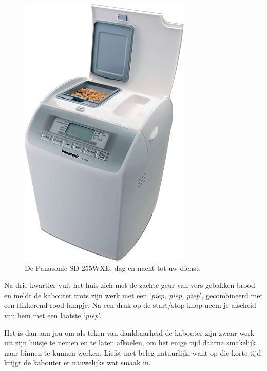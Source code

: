 \documentclass[
  11pt,
  dutch,
]{memoir}
\begin{document}
\begin{figure}
\includegraphics[width=1.4\linewidth]{img/bw/panasonic.jpg}
\caption[De Panasonic SD-255WXE. \textcopyright \: Panasonic]{De Panasonic SD-255WXE, dag en nacht tot uw dienst.}
\end{figure}

Na drie kwartier vult het huis zich met de zachte geur van vers gebakken
brood en meldt de kabouter trots zijn werk met een `\emph{piep, piep,
piep}', gecombineerd met een flikkerend rood lampje. Na een druk op de
start/stop-knop neem je afscheid van hem met een laatste `\emph{piep}'.

Het is dan aan jou om als teken van dankbaarheid de kabouter zijn zwaar
werk uit zijn huisje te nemen en te laten afkoelen, om het enige tijd
daarna smakelijk naar binnen te kunnen werken. Liefst met beleg
natuurlijk, want op die korte tijd krijgt de kabouter er nauwelijks wat
smaak in.
\end{document}
